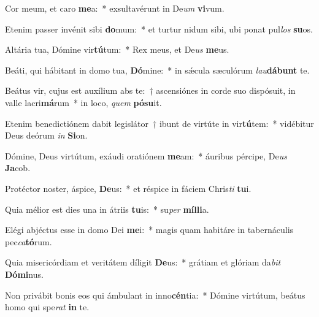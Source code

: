 \item Cor meum, et caro \textbf{me}a:~* exsultavérunt in De\textit{um} \textbf{vi}vum.
\item Etenim passer invénit sibi \textbf{do}mum:~* et turtur nidum sibi, ubi ponat pul\textit{los} \textbf{su}os.
\item Altária tua, Dómine vir\textbf{tú}tum:~* Rex meus, et De\textit{us} \textbf{me}us.
\item Beáti, qui hábitant in domo tua, \textbf{Dó}mine:~* in sǽcula sæculórum \textit{lau}\textbf{dá}\textbf{bunt} te.
\item Beátus vir, cujus est auxílium abs te:~† ascensiónes in corde suo dispósuit, in valle lacri\textbf{má}rum~* in loco, \textit{quem} \textbf{pó}\textbf{su}it.
\item Etenim benedictiónem dabit legislátor~† ibunt de virtúte in vir\textbf{tú}tem:~* vidébitur Deus deórum \textit{in} \textbf{Si}on.
\item Dómine, Deus virtútum, exáudi oratiónem \textbf{me}am:~* áuribus pércipe, De\textit{us} \textbf{Ja}cob.
\item Protéctor noster, áspice, \textbf{De}us:~* et réspice in fáciem Chris\textit{ti} \textbf{tu}i.
\item Quia mélior est dies una in átriis \textbf{tu}is:~* su\textit{per} \textbf{míl}\textbf{li}a.
\item Elégi abjéctus esse in domo Dei \textbf{me}i:~* magis quam habitáre in tabernáculis pec\textit{ca}\textbf{tó}rum.
\item Quia misericórdiam et veritátem díligit \textbf{De}us:~* grátiam et glóriam da\textit{bit} \textbf{Dó}\textbf{mi}nus.
\item Non privábit bonis eos qui ámbulant in inno\textbf{cén}tia:~* Dómine virtútum, beátus homo qui spe\textit{rat} \textbf{in} te.
